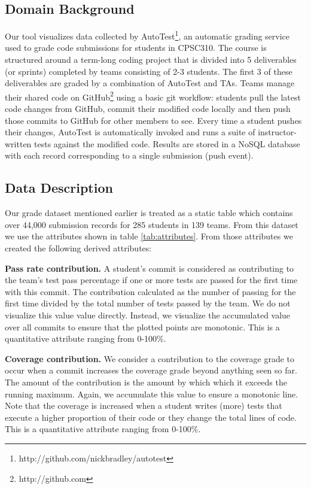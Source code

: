 \documentclass[../manifest.tex]{subfiles}
\begin{document}
\subsection{Domain Background}
Our tool visualizes data collected by AutoTest\footnote{http://github.com/nickbradley/autotest},
an automatic grading service used to grade code submissions for students in
CPSC310. The course is structured around a term-long coding project that is
divided into 5 deliverables (or sprints) completed by teams consisting of 2-3 students.
The first 3 of these deliverables are graded by a combination of AutoTest and TAs.
Teams manage their shared code on GitHub\footnote{http://github.com}
using a basic git workflow: students pull the latest code changes from GitHub,
commit their modified code locally and then push those commits to GitHub for
other members to see. Every time a student pushes their changes, AutoTest is
automatically invoked and runs a suite of instructor-written tests against the modified
code. Results are stored in a NoSQL database with each record corresponding to a
single submission (push event).


\subsection{Data Description} \label{ssec:data-description}
Our grade dataset mentioned earlier is treated as a static table which contains over 44,000 submission records for 285 students in 139 teams. From this dataset we use the attributes shown in table \ref{tab:attributes}. From those attributes we created the following derived attributes:

\textbf{Pass rate contribution.} A student's commit is considered as contributing to the team's test pass percentage if one or more tests are passed for the first time with this commit. The contribution calculated as the number of passing for the first time divided by the total number of tests passed by the team. We do not visualize this value value directly. Instead, we visualize the accumulated value over all commits to ensure that the plotted points are monotonic. This is a quantitative attribute ranging from 0-100\%.

\textbf{Coverage contribution.} We consider a contribution to the coverage grade to occur when a commit increases the coverage grade beyond anything seen so far. The amount of the  contribution is the amount by which which it exceeds the running maximum. Again, we accumulate this value to ensure a monotonic line. Note that the coverage is increased when a student writes (more) tests that execute a higher proportion of their code or they change the total lines of code. This is a quantitative attribute ranging from 0-100\%.
\end{document}
